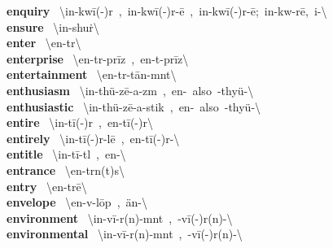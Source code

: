 \documentclass[10pt,a4paper]{article}
\begin{document}
\begin{multicols}{2}
\textbf{ enquiry }\quad \ \textbackslash in-\textprimstress kw\={i}(-\textschwa )r\ ,\ \textprimstress in-\textsecstress kw\={i}(-\textschwa )r-\={e}\ ,\ in-\textprimstress kw\={i}(-\textschwa )r-\={e};\ \textprimstress in-kw\textschwa -r\={e},\ \textprimstress i\engma -\textbackslash \\
\textbf{ ensure }\quad \ \textbackslash in-\textprimstress shu\. r\textbackslash \\
\textbf{ enter }\quad \ \textbackslash \textprimstress en-t\textschwa r\textbackslash \\
\textbf{ enterprise }\quad \ \textbackslash \textprimstress en-t\textschwa r-\textsecstress pr\={i}z\ ,\ \textprimstress en-t\textschwa -\textsecstress pr\={i}z\textbackslash \\
\textbf{ entertainment }\quad \ \textbackslash \textsecstress en-t\textschwa r-\textprimstress t\={a}n-m\textschwa nt\textbackslash \\
\textbf{ enthusiasm }\quad \ \textbackslash in-\textprimstress th\"{u}-z\={e}-\textsecstress a-z\textschwa m\ ,\ en-\ also\ -\textprimstress thy\"{u}-\textbackslash \\
\textbf{ enthusiastic }\quad \ \textbackslash in-\textsecstress th\"{u}-z\={e}-\textprimstress a-stik\ ,\ en-\ also\ -\textsecstress thy\"{u}-\textbackslash \\
\textbf{ entire }\quad \ \textbackslash in-\textprimstress t\={i}(-\textschwa )r\ ,\ \textprimstress en-\textsecstress t\={i}(-\textschwa )r\textbackslash \\
\textbf{ entirely }\quad \ \textbackslash in-\textprimstress t\={i}(-\textschwa )r-l\={e}\ ,\ \textprimstress en-\textsecstress t\={i}(-\textschwa )r-\textbackslash \\
\textbf{ entitle }\quad \ \textbackslash in-\textprimstress t\={i}-t\textsuperscript{\textreve}l\ ,\ en-\textbackslash \\
\textbf{ entrance }\quad \ \textbackslash \textprimstress en-tr\textschwa n(t)s\textbackslash \\
\textbf{ entry }\quad \ \textbackslash \textprimstress en-tr\={e}\textbackslash \\
\textbf{ envelope }\quad \ \textbackslash \textprimstress en-v\textschwa -\textsecstress l\={o}p\ ,\ \textprimstress \"{a}n-\textbackslash \\
\textbf{ environment }\quad \ \textbackslash in-\textprimstress v\={i}-r\textschwa (n)-m\textschwa nt\ ,\ -\textprimstress v\={i}(-\textschwa )r(n)-\textbackslash \\
\textbf{ environmental }\quad \ \textbackslash in-\textprimstress v\={i}-r\textschwa (n)-m\textschwa nt\ ,\ -\textprimstress v\={i}(-\textschwa )r(n)-\textbackslash \\

\end{multicols}
\end{document}
